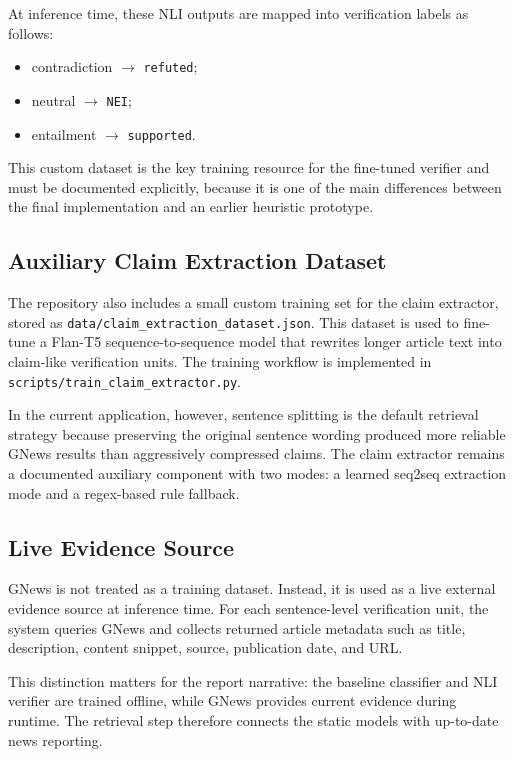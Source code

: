 \documentclass[11pt]{article}
\newcommand{\code}[1]{\texttt{#1}}
\begin{document}
At inference time, these NLI outputs are mapped into verification labels as
follows:

\begin{itemize}
    \item contradiction $\rightarrow$ \code{refuted};
    \item neutral $\rightarrow$ \code{NEI};
    \item entailment $\rightarrow$ \code{supported}.
\end{itemize}

This custom dataset is the key training resource for the fine-tuned verifier and
must be documented explicitly, because it is one of the main differences between
the final implementation and an earlier heuristic prototype.

\subsection{Auxiliary Claim Extraction Dataset}

The repository also includes a small custom training set for the claim
extractor, stored as \code{data/claim\_extraction\_dataset.json}. This dataset is
used to fine-tune a Flan-T5 sequence-to-sequence model that rewrites longer
article text into claim-like verification units. The training workflow is
implemented in \code{scripts/train\_claim\_extractor.py}.

In the current application, however, sentence splitting is the default retrieval
strategy because preserving the original sentence wording produced more reliable
GNews results than aggressively compressed claims. The claim extractor remains a
documented auxiliary component with two modes: a learned seq2seq extraction mode
and a regex-based rule fallback.

\subsection{Live Evidence Source}

GNews is not treated as a training dataset. Instead, it is used as a live
external evidence source at inference time. For each sentence-level verification
unit, the system queries GNews and collects returned article metadata such as
title, description, content snippet, source, publication date, and URL.

This distinction matters for the report narrative: the baseline classifier and
NLI verifier are trained offline, while GNews provides current evidence during
runtime. The retrieval step therefore connects the static models with up-to-date
news reporting.
\end{document}
